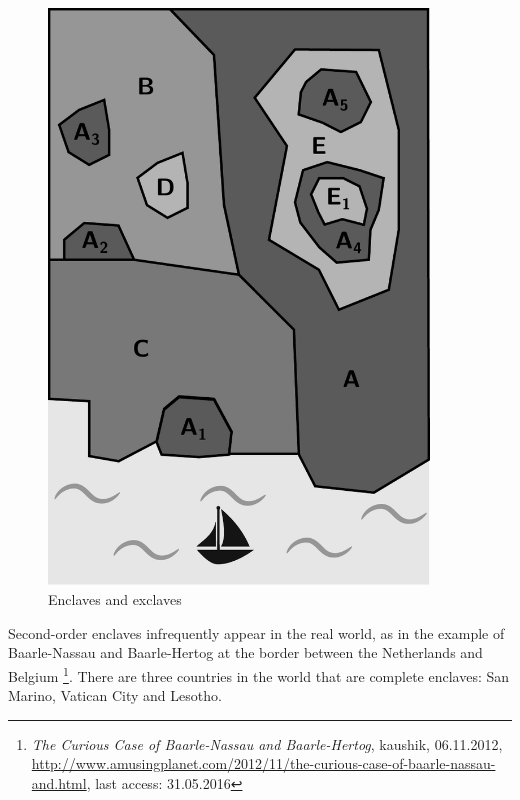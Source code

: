 \begin{minipage}[t]{0.35\textwidth}

\vspace{-2em}
\begin{figure}[H]
  \centering
  \includegraphics[width=0.9\textwidth]{graphics/basics/countries/enclaves_exclaves}
  \caption{Enclaves and exclaves \protect\footnotemark}
  \label{fig:enclaves_exclaves}
\end{figure}

\end{minipage}    %


Second-order enclaves infrequently appear in the real world, as in the example of Baarle-Nassau and Baarle-Hertog at the border between the Netherlands and Belgium
\footnote{
  \emph{The Curious Case of Baarle-Nassau and Baarle-Hertog},
  kaushik, 06.11.2012,
  \url{http://www.amusingplanet.com/2012/11/the-curious-case-of-baarle-nassau-and.html},
  last access: 31.05.2016
}.
There are three countries in the world that are complete enclaves: San Marino, Vatican City and Lesotho.

